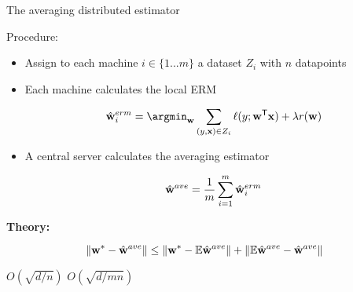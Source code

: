 \begin{frame}{The averaging distributed estimator}

Procedure:

\begin{itemize}

\item Assign to each machine $i\in\{1...m\}$ a dataset $Z_i$ with $n$ datapoints

\item Each machine calculates the local ERM

\begin{equation}
\wmle_i = \argmin_{\w} \sum_{(y,\x)\in Z_i} \loss(y;\trans\w\x) + \lambda\reg(\w)
\end{equation}

\item A central server calculates the averaging estimator

\begin{equation}
\hat{\mathbf w}^{ave} = \frac{1}{m}\sum_{i=1}^m \hat{\mathbf w}^{erm}_i
\end{equation}

\end{itemize}

\textbf{Theory:}


\begin{equation}
{\lVert {{\mathbf w^{*}}-\hat{\mathbf w}^{ave}} \rVert} \le 
{\lVert {{\mathbf w^{*}}-\mathbb{E}\hat{\mathbf w}^{ave}} \rVert} 
+
{\lVert {\mathbb{E}\hat{\mathbf w}^{ave}-\hat{\mathbf w}^{ave}} \rVert} 
\end{equation}

\hspace{1.9in}
$O(\sqrt{d/n})$
\hspace{0.3in}
$O(\sqrt{d/mn})$

\end{frame}



